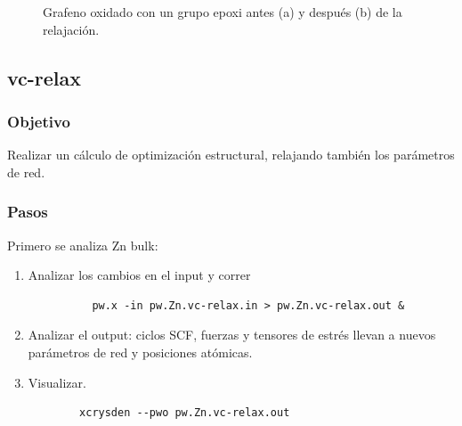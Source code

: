   \begin{figure}[H]
      \centering
       \caption{Grafeno oxidado con un grupo epoxi antes (a) y después (b) de la relajación.}
   \end{figure}


\subsection{vc-relax}

\subsubsection{Objetivo}

  Realizar un cálculo de optimización estructural, relajando también los parámetros de red.

\subsubsection{Pasos}

  Primero se analiza Zn bulk:
    \begin{enumerate}
      \item Analizar los cambios en el input y correr
        \begin{verbatim}
          pw.x -in pw.Zn.vc-relax.in > pw.Zn.vc-relax.out &
        \end{verbatim}
      \item Analizar el output: ciclos SCF, fuerzas y tensores de estrés llevan a nuevos parámetros de red y posiciones atómicas.
      \item Visualizar.
      \begin{verbatim}
        xcrysden --pwo pw.Zn.vc-relax.out
      \end{verbatim}
    \end{enumerate}

